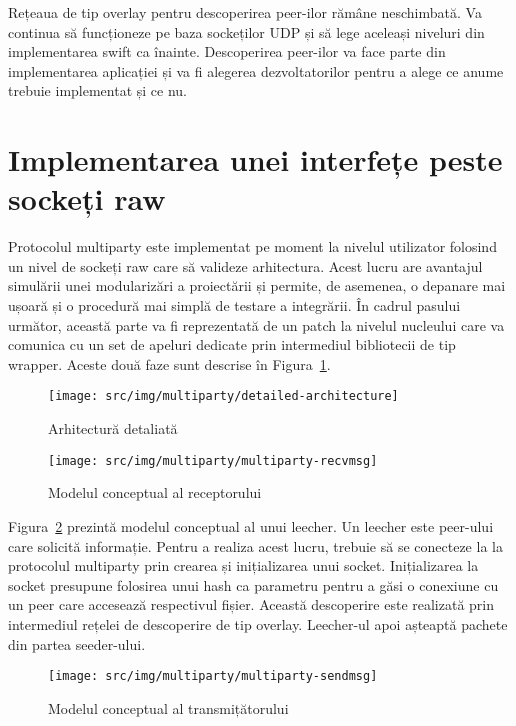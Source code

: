Rețeaua de tip overlay pentru descoperirea peer-ilor rămâne neschimbată. Va
continua să funcționeze pe baza sockeților UDP și să lege aceleași niveluri
din implementarea swift ca înainte. Descoperirea peer-ilor va face parte din
implementarea aplicației și va fi alegerea dezvoltatorilor pentru a alege ce
anume trebuie implementat și ce nu.

\section{Implementarea unei interfețe peste sockeți raw}
\label{sec:multiparty:raw-socket}

Protocolul multiparty este implementat pe moment la nivelul utilizator
folosind un nivel de sockeți raw care să valideze arhitectura. Acest lucru are
avantajul simulării unei modularizări a proiectării și permite, de asemenea, o
depanare mai ușoară și o procedură mai simplă de testare a integrării. În
cadrul pasului următor, această parte va fi reprezentată de un patch la
nivelul nucleului care va comunica cu un set de apeluri dedicate prin
intermediul bibliotecii de tip wrapper. Aceste două faze sunt descrise în
Figura~\ref{fig:multiparty:detailed-architecture}.

\begin{figure}
  \centering
  \texttt{[image: src/img/multiparty/detailed-architecture]}
  \caption{Arhitectură detaliată}
  \label{fig:multiparty:detailed-architecture}
\end{figure}

\begin{figure}
  \centering
  \texttt{[image: src/img/multiparty/multiparty-recvmsg]}
  \caption{Modelul conceptual al receptorului}
  \label{fig:multiparty:multiparty-recvmsg}
\end{figure}

Figura~\ref{fig:multiparty:multiparty-recvmsg} prezintă modelul conceptual al
unui leecher. Un leecher este peer-ului care solicită informație. Pentru a
realiza acest lucru, trebuie să se conecteze la la protocolul multiparty prin
crearea și inițializarea unui socket. Inițializarea la socket presupune
folosirea unui hash ca parametru pentru a găsi o conexiune cu un peer care
accesează respectivul fișier. Această descoperire este realizată prin
intermediul rețelei de descoperire de tip overlay. Leecher-ul apoi așteaptă
pachete din partea seeder-ului.

\begin{figure}
  \centering
  \texttt{[image: src/img/multiparty/multiparty-sendmsg]}
  \caption{Modelul conceptual al transmițătorului}
  \label{fig:multiparty:multiparty-sendmsg}
\end{figure}

